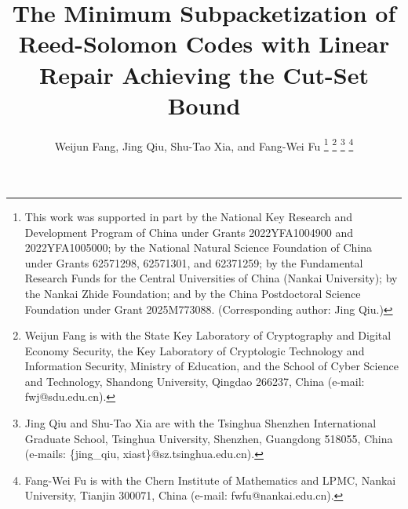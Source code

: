 \documentclass[11pt,onecolumn]{IEEEtran}
\begin{document}
\title{The Minimum Subpacketization of Reed-Solomon Codes with Linear Repair Achieving the Cut-Set Bound}


\author{%
Weijun Fang, Jing Qiu, Shu-Tao Xia, and Fang-Wei Fu%
\thanks{This work was supported in part by the National Key Research and Development Program of China under Grants 2022YFA1004900 and 2022YFA1005000; by the National Natural Science Foundation of China under Grants 62571298, 62571301, and 62371259;
by the Fundamental Research Funds for the Central Universities of China (Nankai University); by the Nankai Zhide Foundation; and by the China Postdoctoral Science Foundation under Grant 2025M773088. (Corresponding author: Jing Qiu.)}
\thanks{Weijun Fang is with the State Key Laboratory of Cryptography and Digital Economy Security, the Key Laboratory of Cryptologic Technology and Information Security, Ministry of Education, and the School of Cyber Science and Technology, Shandong University, Qingdao 266237, China (e-mail: fwj@sdu.edu.cn).}
\thanks{Jing Qiu and Shu-Tao Xia are with the Tsinghua Shenzhen International Graduate School, Tsinghua University, Shenzhen, Guangdong 518055, China 
(e-mails: \{jing\_qiu, xiast\}@sz.tsinghua.edu.cn).}
%
\thanks{Fang-Wei Fu is with the Chern Institute of Mathematics and LPMC, Nankai University, Tianjin 300071, China (e-mail: fwfu@nankai.edu.cn).}%
}
\maketitle
\end{document}
